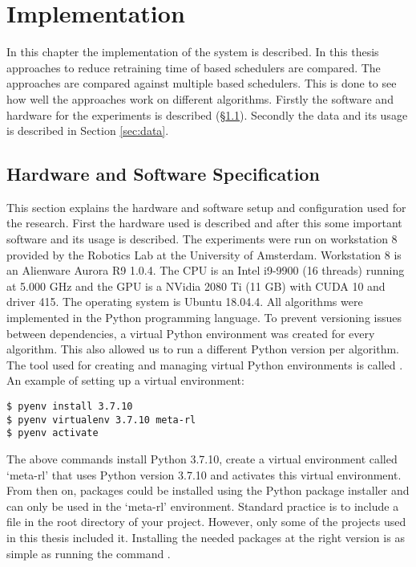 \chapter{Implementation}

In this chapter the implementation of the system is described. In this thesis
approaches to reduce retraining time of \rl based schedulers are compared. The
approaches are compared against multiple \rl based schedulers. This is done to
see how well the approaches work on different \rl algorithms. Firstly the
software and hardware for the experiments is described (§\ref{sec:setup}).
Secondly the data and its usage is described in Section \ref{sec:data}.

\section{Hardware and Software Specification}\label{sec:setup}

This section explains the hardware and software setup and configuration used
for the research. First the hardware used is described and after this some
important software and its usage is described. The experiments were run on
workstation 8 provided by the Robotics Lab at the University of Amsterdam.
Workstation 8 is an Alienware Aurora R9 1.0.4. The CPU is an Intel i9-9900 (16
threads) running at 5.000 GHz and the GPU is a NVidia 2080 Ti (11 GB) with
CUDA 10 and driver 415. The operating system is Ubuntu 18.04.4. All algorithms
were implemented in the Python programming language. To
prevent versioning issues between dependencies, a virtual Python environment
was created for every algorithm. This also allowed us to run a different
Python version per algorithm. The tool used for creating and managing virtual
Python environments is called .
An example of setting up a virtual environment:

\begin{verbatim}
$ pyenv install 3.7.10
$ pyenv virtualenv 3.7.10 meta-rl
$ pyenv activate
\end{verbatim}

The above commands install Python 3.7.10, create a virtual environment called
`meta-rl' that uses Python version 3.7.10 and activates this virtual
environment. From then on, packages could be installed using the Python
package installer  and can only be used in the `meta-rl'
environment. Standard practice is to include a  file in
the root directory of your project. However, only some of the projects used in
this thesis included it. Installing the needed packages at the right version
is as simple as running the command .

